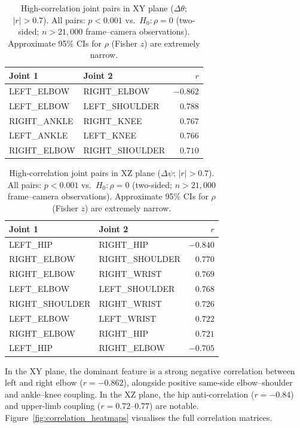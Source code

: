 \documentclass[english,fleqn]{ieej-e}
\begin{document}
\begin{table}[!t]
\centering
\caption{High-correlation joint pairs in XY plane ($\Delta\theta$; $|r|>0.7$).
  All pairs: $p<0.001$ vs.\ $H_0:\rho=0$ (two-sided; $n>21{,}000$
  frame--camera observations). Approximate 95\% CIs for $\rho$ (Fisher $z$)
  are extremely narrow.}
\label{tab:correlation_theta}
\small
\begin{tabular}{llr}
\toprule
Joint 1        & Joint 2        & $r$ \\
\midrule
LEFT\_ELBOW    & RIGHT\_ELBOW   & $-0.862$ \\
LEFT\_ELBOW    & LEFT\_SHOULDER &  $0.788$ \\
RIGHT\_ANKLE   & RIGHT\_KNEE    &  $0.767$ \\
LEFT\_ANKLE    & LEFT\_KNEE     &  $0.766$ \\
RIGHT\_ELBOW   & RIGHT\_SHOULDER&  $0.710$ \\
\bottomrule
\end{tabular}
\end{table}

\begin{table}[!t]
\centering
\caption{High-correlation joint pairs in XZ plane ($\Delta\psi$; $|r|>0.7$).
  All pairs: $p<0.001$ vs.\ $H_0:\rho=0$ (two-sided; $n>21{,}000$
  frame--camera observations). Approximate 95\% CIs for $\rho$ (Fisher $z$)
  are extremely narrow.}
\label{tab:correlation_psi}
\small
\begin{tabular}{llr}
\toprule
Joint 1        & Joint 2         & $r$ \\
\midrule
LEFT\_HIP      & RIGHT\_HIP      & $-0.840$ \\
RIGHT\_ELBOW   & RIGHT\_SHOULDER &  $0.770$ \\
RIGHT\_ELBOW   & RIGHT\_WRIST    &  $0.769$ \\
LEFT\_ELBOW    & LEFT\_SHOULDER  &  $0.768$ \\
RIGHT\_SHOULDER& RIGHT\_WRIST    &  $0.726$ \\
LEFT\_ELBOW    & LEFT\_WRIST     &  $0.722$ \\
RIGHT\_ELBOW   & RIGHT\_HIP      &  $0.721$ \\
LEFT\_HIP      & RIGHT\_ELBOW    & $-0.705$ \\
\bottomrule
\end{tabular}
\end{table}

In the XY plane, the dominant feature is a strong negative correlation
between left and right elbow ($r=-0.862$), alongside positive same-side
elbow--shoulder and ankle--knee coupling. In the XZ plane, the hip
anti-correlation ($r=-0.84$) and upper-limb coupling ($r=0.72$--$0.77$) are
notable. Figure~\ref{fig:correlation_heatmaps} visualises the full
correlation matrices.
\end{document}
